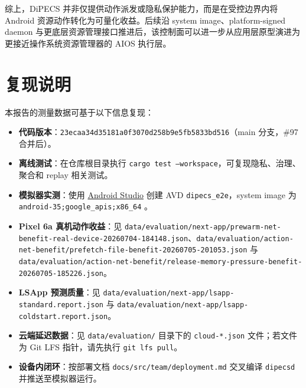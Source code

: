 \documentclass[12pt,a4paper]{article}
\begin{document}
综上，DiPECS 并非仅提供动作派发或隐私保护能力，而是在受控边界内将 Android 资源动作转化为可量化收益。后续沿 system image、platform-signed daemon 与更底层资源管理接口推进后，该控制面可以进一步从应用层原型演进为更接近操作系统资源管理器的 AIOS 执行层。

\appendix
\section{复现说明}\label{app:reproduction}

本报告的测量数据可基于以下信息复现：

\begin{itemize}
  \item \textbf{代码版本}：\texttt{23ecaa34\allowbreak d35181a0\allowbreak f3070d25\allowbreak 8b9e5fb5\allowbreak 833bd516}（main 分支，\#97 合并后）。
  \item \textbf{离线测试}：在仓库根目录执行 \texttt{cargo test --workspace}，可复现隐私、治理、聚合和 replay 相关测试。
  \item \textbf{模拟器实测}：使用 \href{https://developer.android.com/studio}{Android Studio} 创建 AVD \texttt{dipecs\_e2e}，system image 为 \texttt{android-35;\allowbreak google\_apis;\allowbreak x86\_64} \cite{android-emulator,android-api-35}。
  \item \textbf{Pixel 6a 真机动作收益}：见 \texttt{data/evaluation/next-app/prewarm-net-benefit-real-device-20260704-184148.json}、\texttt{data/evaluation/action-net-benefit/prefetch-file-benefit-20260705-201053.json} 与 \texttt{data/evaluation/action-net-benefit/release-memory-pressure-benefit-20260705-185226.json}。
  \item \textbf{LSApp 预测质量}：见 \texttt{data/evaluation/next-app/lsapp-standard.report.json} 与 \texttt{data/evaluation/next-app/lsapp-coldstart.report.json}。
  \item \textbf{云端延迟数据}：见 \texttt{data/evaluation/} 目录下的 \texttt{cloud-*.json} 文件；若文件为 Git LFS 指针，请先执行 \texttt{git lfs pull}。
  \item \textbf{设备内闭环}：按部署文档 \texttt{docs/\allowbreak src/\allowbreak team/\allowbreak deployment.md} 交叉编译 \texttt{dipecsd} 并推送至模拟器运行。
\end{itemize}



\end{document}
